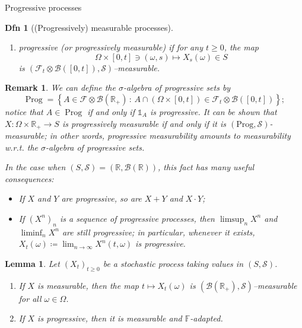 \documentclass[a4paper]{article}
\theoremstyle{mytheoremstyle}
\newtheorem{definition}{Dfn}
\newtheorem{lemma}{Lemma}
\newtheorem*{remark}{Remark}
\newcommand{\1}{\mathds{1}}
\begin{document}
\begin{multicols*}{3}
\begin{roundbox}{Progressive processes}
\begin{definition}[(Progressively) measurable processes]
\begin{enumerate}[parsep=0.2pt]
    \item {\emph{progressive}} (or {\emph{progressively measurable}}) if for
    any $t \geqslant 0$, the map
    \[ \Omega \times [0, t] \ni (\omega, s) \mapsto X_s (\omega) \in S \]
    is $(\mathcal{F}_t \otimes \mathcal{B}([0, t]), \mathcal{S})$--measurable.
  \end{enumerate}
\end{definition}

\begin{remark}
  \label{rem:progressive.sets}We can define the $\sigma$-algebra of
  {\emph{progressive sets}} by
  \[
    \operatorname{Prog} = \left\{ A \in \mathcal{F} \otimes \mathcal{B}
     (\mathbb{R}_+) \, : \, A \cap (\Omega \times [0, t]) \in \mathcal{F}_t
     \otimes \mathcal{B} ([0, t]) \right\} ;
   \]
  notice that $A \in \operatorname{Prog}$ if and only if $\1_A$ is
  progressive. It can be shown that $X : \Omega \times \mathbb{R}_+
  \rightarrow S$ is progressively measurable if and only if it is
  $(\mathrm{Prog}, \mathcal{S})$-measurable; in other words, progressive
  measurability amounts to measurability w.r.t. the $\sigma$-algebra of
  progressive sets.
  
  In the case when $(S, \mathcal{S}) = (\mathbb{R}, \mathcal{B}
  (\mathbb{R}))$, this fact has many useful consequences:
  \begin{itemize}
    \item If $X$ and $Y$ are progressive, so are $X + Y$ and $X \cdot Y$;
    
    \item If $(X^n)_n$ is a sequence of progressive processes, then $\limsup_n
    X^n$ and $\liminf_n X^n$ are still progressive; in particular, whenever it
    exists, $X_t (\omega) \coloneq \lim_{n \rightarrow \infty} X^n (t, \omega)$
    is progressive.
  \end{itemize}
\end{remark}

\begin{lemma}
  \label{lem:progr mb trajectories}Let $(X_t)_{t \geqslant 0}$ be a stochastic
  process taking values in $(S, \mathcal{S})$.
  \begin{enumerate}
    \item If $X$ is measurable, then the map $t \mapsto X_t (\omega)$ is
    $(\mathcal{B}(\mathbb{R}_+), \mathcal{S})$--measurable for all $\omega \in
    \Omega$.
    
    \item If $X$ is progressive, then it is measurable and
    $\mathbb{F}$-adapted.
    

\end{enumerate}
\end{lemma}
\end{roundbox}
\end{multicols*}
\end{document}
